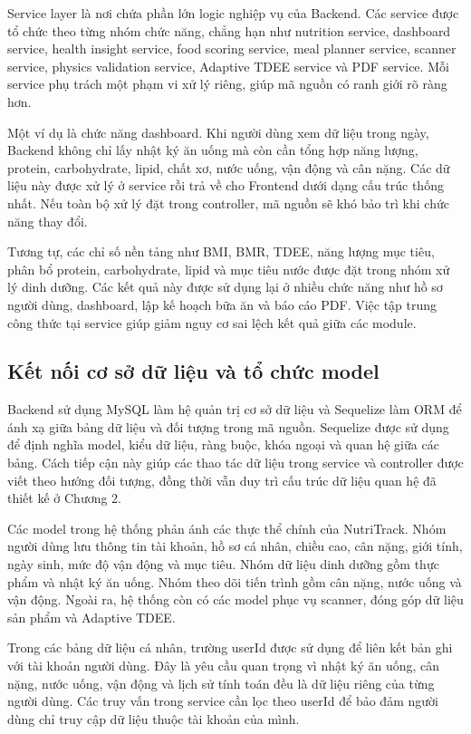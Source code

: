 \documentclass[12pt, a4paper]{report}
\begin{document}
Service layer là nơi chứa phần lớn logic nghiệp vụ của Backend. Các service được tổ chức theo từng nhóm chức năng, chẳng hạn như nutrition service, dashboard service, health insight service, food scoring service, meal planner service, scanner service, physics validation service, Adaptive TDEE service và PDF service. Mỗi service phụ trách một phạm vi xử lý riêng, giúp mã nguồn có ranh giới rõ ràng hơn.

Một ví dụ là chức năng dashboard. Khi người dùng xem dữ liệu trong ngày, Backend không chỉ lấy nhật ký ăn uống mà còn cần tổng hợp năng lượng, protein, carbohydrate, lipid, chất xơ, nước uống, vận động và cân nặng. Các dữ liệu này được xử lý ở service rồi trả về cho Frontend dưới dạng cấu trúc thống nhất. Nếu toàn bộ xử lý đặt trong controller, mã nguồn sẽ khó bảo trì khi chức năng thay đổi.

Tương tự, các chỉ số nền tảng như BMI, BMR, TDEE, năng lượng mục tiêu, phân bổ protein, carbohydrate, lipid và mục tiêu nước được đặt trong nhóm xử lý dinh dưỡng. Các kết quả này được sử dụng lại ở nhiều chức năng như hồ sơ người dùng, dashboard, lập kế hoạch bữa ăn và báo cáo PDF. Việc tập trung công thức tại service giúp giảm nguy cơ sai lệch kết quả giữa các module.

\subsection{Kết nối cơ sở dữ liệu và tổ chức model}Backend sử dụng MySQL làm hệ quản trị cơ sở dữ liệu và Sequelize làm ORM để ánh xạ giữa bảng dữ liệu và đối tượng trong mã nguồn. Sequelize được sử dụng để định nghĩa model, kiểu dữ liệu, ràng buộc, khóa ngoại và quan hệ giữa các bảng. Cách tiếp cận này giúp các thao tác dữ liệu trong service và controller được viết theo hướng đối tượng, đồng thời vẫn duy trì cấu trúc dữ liệu quan hệ đã thiết kế ở Chương 2.

Các model trong hệ thống phản ánh các thực thể chính của NutriTrack. Nhóm người dùng lưu thông tin tài khoản, hồ sơ cá nhân, chiều cao, cân nặng, giới tính, ngày sinh, mức độ vận động và mục tiêu. Nhóm dữ liệu dinh dưỡng gồm thực phẩm và nhật ký ăn uống. Nhóm theo dõi tiến trình gồm cân nặng, nước uống và vận động. Ngoài ra, hệ thống còn có các model phục vụ scanner, đóng góp dữ liệu sản phẩm và Adaptive TDEE.

Trong các bảng dữ liệu cá nhân, trường userId được sử dụng để liên kết bản ghi với tài khoản người dùng. Đây là yêu cầu quan trọng vì nhật ký ăn uống, cân nặng, nước uống, vận động và lịch sử tính toán đều là dữ liệu riêng của từng người dùng. Các truy vấn trong service cần lọc theo userId để bảo đảm người dùng chỉ truy cập dữ liệu thuộc tài khoản của mình.
\end{document}
